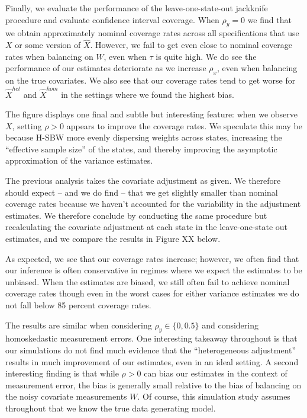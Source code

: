 Finally, we evaluate the performance of the leave-one-state-out jackknife procedure and evaluate confidence interval coverage. When $\rho_y = 0$ we find that we obtain approximately nominal coverage rates across all specifications that use $X$ or some version of $\hat{X}$. However, we fail to get even close to nominal coverage rates when balancing on $W$, even when $\tau$ is quite high. We do see the performance of our estimates deteriorate as we increase $\rho_x$, even when balancing on the true covariates. We also see that our coverage rates tend to get worse for $\hat{X}^{het}$ and $\hat{X}^{hom}$ in the settings where we found the highest bias.

The figure displays one final and subtle but interesting feature: when we observe $X$, setting $\rho > 0$ appears to improve the coverage rates. We speculate this may be because H-SBW more evenly dispersing weights across states, increasing the ``effective sample size'' of the states, and thereby improving the asymptotic approximation of the variance estimates. 

The previous analysis takes the covariate adjustment as given. We therefore should expect -- and we do find -- that we get slightly smaller than nominal coverage rates because we haven't accounted for the variability in the adjustment estimates. We therefore conclude by conducting the same procedure but recalculating the covariate adjustment at each state in the leave-one-state out estimates, and we compare the results in Figure XX below.

As expected, we see that our coverage rates increase; however, we often find that our inference is often conservative in regimes where we expect the estimates to be unbiased. When the estimates are biased, we still often fail to achieve nominal coverage rates though even in the worst cases for either variance estimates we do not fall below 85 percent coverage rates.

The results are similar when considering $\rho_y \in \{0, 0.5\}$ and considering homoskedastic measurement errors. One interesting takeaway throughout is that our simulations do not find much evidence that the ``heterogeneous adjustment'' results in much improvement of our estimates, even in an ideal setting. A second interesting finding is that while $\rho > 0$ can bias our estimates in the context of measurement error, the bias is generally small relative to the bias of balancing on the noisy covariate measurements $W$. Of course, this simulation study assumes throughout that we know the true data generating model. 

